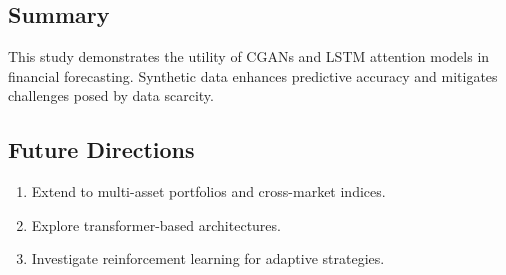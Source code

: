 \documentclass[conference]{IEEEtran}
\begin{document}
\subsection{Summary}
This study demonstrates the utility of CGANs and LSTM attention models in financial forecasting. Synthetic data enhances predictive accuracy and mitigates challenges posed by data scarcity.

\subsection{Future Directions}
\begin{enumerate}
    \item Extend to multi-asset portfolios and cross-market indices.
    \item Explore transformer-based architectures.
    \item Investigate reinforcement learning for adaptive strategies.
\end{enumerate}



\end{document}

